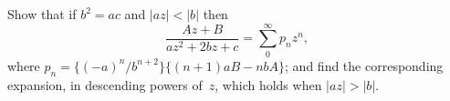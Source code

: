 Show that if $b^{2} = ac$ and $|az| < |b|$ then
\[
\frac{Az + B}{az^{2} + 2bz + c} = \sum_{0}^{\infty} p_{n}z^{n},
\]
where $p_{n} = \{(-a)^{n}/b^{n+2}\} \{(n + 1)aB - nbA\}$; and find the corresponding expansion,
in descending powers of~$z$, which holds when $|az| > |b|$.

